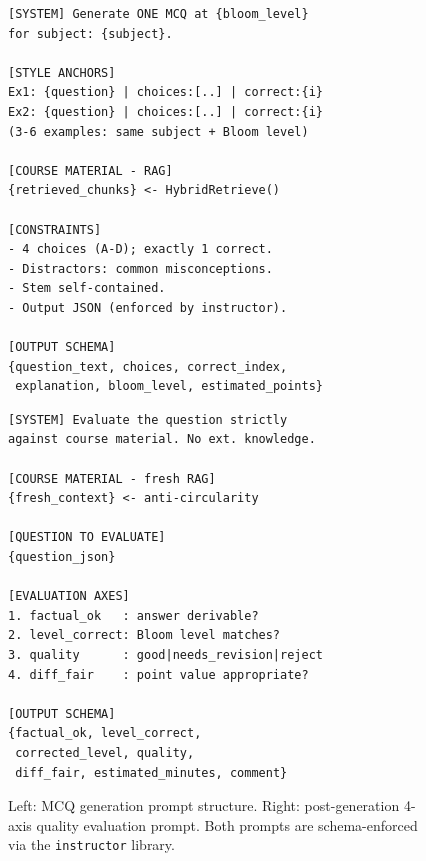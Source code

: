\begin{figure}[H]
\noindent
\begin{minipage}[t]{0.48\textwidth}
\begin{lstlisting}[basicstyle=\ttfamily\tiny, breaklines=true,
  frame=single, backgroundcolor=\color{gray!6}]
[SYSTEM] Generate ONE MCQ at {bloom_level}
for subject: {subject}.

[STYLE ANCHORS]
Ex1: {question} | choices:[..] | correct:{i}
Ex2: {question} | choices:[..] | correct:{i}
(3-6 examples: same subject + Bloom level)

[COURSE MATERIAL - RAG]
{retrieved_chunks} <- HybridRetrieve()

[CONSTRAINTS]
- 4 choices (A-D); exactly 1 correct.
- Distractors: common misconceptions.
- Stem self-contained.
- Output JSON (enforced by instructor).

[OUTPUT SCHEMA]
{question_text, choices, correct_index,
 explanation, bloom_level, estimated_points}
\end{lstlisting}
\end{minipage}
\hfill
\begin{minipage}[t]{0.48\textwidth}
\begin{lstlisting}[basicstyle=\ttfamily\tiny, breaklines=true,
  frame=single, backgroundcolor=\color{gray!6}]
[SYSTEM] Evaluate the question strictly
against course material. No ext. knowledge.

[COURSE MATERIAL - fresh RAG]
{fresh_context} <- anti-circularity

[QUESTION TO EVALUATE]
{question_json}

[EVALUATION AXES]
1. factual_ok   : answer derivable?
2. level_correct: Bloom level matches?
3. quality      : good|needs_revision|reject
4. diff_fair    : point value appropriate?

[OUTPUT SCHEMA]
{factual_ok, level_correct,
 corrected_level, quality,
 diff_fair, estimated_minutes, comment}
\end{lstlisting}
\end{minipage}
\caption{Left: MCQ generation prompt structure. Right: post-generation
4-axis quality evaluation prompt. Both prompts are schema-enforced
via the \texttt{instructor} library.}
\label{lst:mcq_prompt}
\end{figure}
